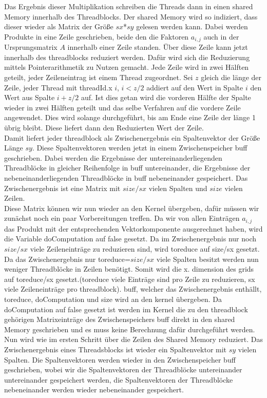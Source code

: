 \documentclass[10pt,a4paper]{article}
\begin{document}
	 Das Ergebnis dieser Multiplikation schreiben die Threads dann in einen shared Memory innerhalb des Threadblocks. Der shared Memory wird so indiziert, dass dieser wieder als Matrix der Größe $sx$*$sy$ gelesen werden kann. Dabei werden Produkte in eine Zeile geschrieben, beide den die Faktoren $a_{i,j}$ auch in der Ursprungsmatrix $A$ innerhalb einer Zeile standen. Über diese Zeile kann jetzt innerhalb des threadblocks reduziert werden. Dafür wird sich die Reduzierung mittels Pointerarithmetik zu Nutzen gemacht. Jede Zeile wird in zwei Hälften geteilt, jeder Zeileneintrag ist einem Thread zugeordnet. Sei $z$ gleich die länge der Zeile, jeder Thread mit threadId.x $i$, $i<z/2$ addiert auf den Wert in Spalte $i$ den Wert aus Spalte $i+z/2$ auf. Ist dies getan wird die vorderen Hälfte der Spalte wieder in zwei Hälften geteilt und das selbe Verfahren auf die vordere Zeile angewendet. Dies wird solange durchgeführt, bis am Ende eine Zeile der länge 1 übrig bleibt. Diese liefert dann den Reduzierten Wert der Zeile. 
	 \\ Damit liefert jeder threadblock als Zwischenergebnis ein Spaltenvektor der Größe Länge $sy$. Diese Spaltenvektoren werden jetzt in einem Zwischenspeicher buff geschrieben. Dabei werden die Ergebnisse der untereinanderliegenden Threadblöcke in gleicher Reihenfolge in buff untereinander, die Ergebnisse der nebeneinanderliegenden Threadblöcke in buff nebeneinander gespeichert. Das Zwischenergebnis ist eine Matrix mit $size/sx$ vielen Spalten und $size$	vielen Zeilen. \\
	 Diese Matrix können wir nun wieder an den Kernel übergeben, dafür müssen wir zunächst noch ein paar Vorbereitungen treffen. Da wir von allen Einträgen $a_{i,j}$ das Produkt mit der entsprechenden Vektorkomponente ausgerechnet haben, wird die Variable doComputation auf false gesetzt. Da im Zwischenergebnis nur noch $size/sx$ viele Zeileneinträge zu reduzieren sind, wird toreduce auf size/sx gesetzt. Da das Zwischenergebnis nur toreduce=$size/sx$ viele Spalten besitzt werden nun weniger Threadblöcke in Zeilen benötigt. Somit wird die x. dimension des grids auf toreduce/sx gesetzt.(toreduce viele Einträge sind pro Zeile zu reduzieren, sx viele Zeileneinträge pro threadblock). buff, welcher das Zwischenergebnis enthällt, toreduce, doComputation und size wird an den kernel übergeben. Da doComputation auf false gesetzt ist werden im Kernel die zu den threadblock gehörigen Matrixeinträge des Zwischenspeichers buff direkt in den shared Memory geschrieben und es muss keine Berechnung dafür durchgeführt werden. Nun wird wie im ersten Schritt über die Zeilen des Shared Memory reduziert. Das Zwischenergebnis eines Threadsblocks ist wieder ein Spaltenvektor mit $sy$ vielen Spalten. Die Spaltenvektoren werden wieder in den Zwischenspeicher buff geschrieben, wobei wir die Spaltenvektoren der Threadblöcke untereinander untereinander gespeichert werden, die Spaltenvektoren der Threadblöcke nebeneinander werden wieder nebeneinander gespeichert. 
\end{document}
